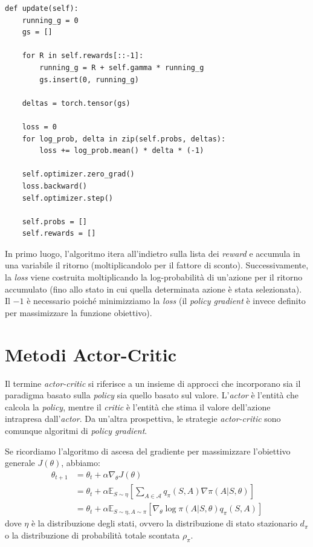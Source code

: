 ﻿\documentclass[11pt, a4paper]{report}
\begin{document}
\begin{verbatim}
def update(self):
    running_g = 0
    gs = []

    for R in self.rewards[::-1]:
        running_g = R + self.gamma * running_g
        gs.insert(0, running_g)

    deltas = torch.tensor(gs)

    loss = 0
    for log_prob, delta in zip(self.probs, deltas):
        loss += log_prob.mean() * delta * (-1)

    self.optimizer.zero_grad()
    loss.backward()
    self.optimizer.step()

    self.probs = []
    self.rewards = []
\end{verbatim}

In primo luogo, l'algoritmo itera all'indietro sulla lista dei \emph{reward} e accumula in una variabile il ritorno (moltiplicandolo per il fattore di sconto). Successivamente, la \emph{loss} viene costruita moltiplicando la log-probabilità di un'azione per il ritorno accumulato (fino allo stato in cui quella determinata azione è stata selezionata). Il $-1$ è necessario poiché minimizziamo la \emph{loss} (il \emph{policy gradient} è invece definito per massimizzare la funzione obiettivo).

\newpage

\chapter{Metodi Actor-Critic}

Il termine \emph{actor-critic} si riferisce a un insieme di approcci che incorporano sia il paradigma basato sulla \emph{policy} sia quello basato sul valore. L'\emph{actor} è l'entità che calcola la \emph{policy}, mentre il \emph{critic} è l'entità che stima il valore dell'azione intrapresa dall'\emph{actor}. Da un'altra prospettiva, le strategie \emph{actor-critic} sono comunque algoritmi di \emph{policy gradient}.

Se ricordiamo l'algoritmo di ascesa del gradiente per massimizzare l'obiettivo generale $J(\theta)$, abbiamo:
\begin{align}
\theta_{t+1} &= \theta_t + \alpha\nabla_\theta J(\theta) \nonumber \\
&= \theta_t + \alpha \mathbb{E}_{S \sim \eta} \left[ \sum_{A \in \mathcal{A}} q_\pi(S, A)\nabla\pi(A|S, \theta) \right] \nonumber \\
&= \theta_t + \alpha \mathbb{E}_{S \sim \eta, A \sim \pi} \left[ \nabla_\theta \log \pi(A|S, \theta)q_\pi(S, A) \right] \label{eq:10.1}
\end{align}
dove $\eta$ è la distribuzione degli stati, ovvero la distribuzione di stato stazionario $d_\pi$ o la distribuzione di probabilità totale scontata $\rho_\pi$.
\end{document}

